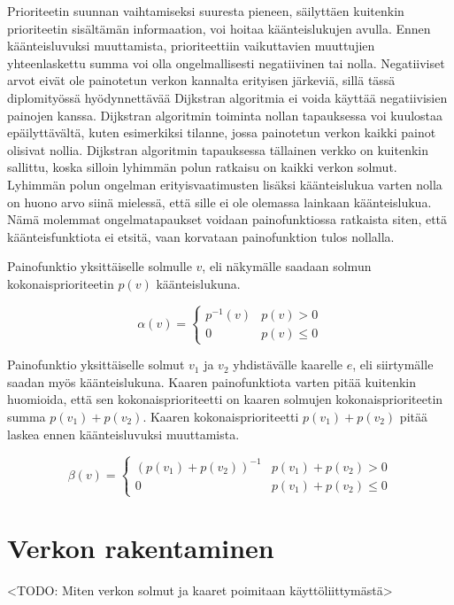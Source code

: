   Prioriteetin suunnan vaihtamiseksi suuresta pieneen, säilyttäen kuitenkin prioriteetin sisältämän informaation, voi hoitaa käänteislukujen avulla.
  Ennen käänteisluvuksi muuttamista, prioriteettiin vaikuttavien muuttujien yhteenlaskettu summa voi olla ongelmallisesti negatiivinen tai nolla.
  Negatiiviset arvot eivät ole painotetun verkon kannalta erityisen järkeviä, sillä tässä diplomityössä hyödynnettävää Dijkstran algoritmia ei voida käyttää negatiivisien painojen kanssa.
  Dijkstran algoritmin toiminta nollan tapauksessa voi kuulostaa epäilyttävältä, kuten esimerkiksi tilanne, jossa painotetun verkon kaikki painot olisivat nollia.
  Dijkstran algoritmin tapauksessa tällainen verkko on kuitenkin sallittu, koska silloin lyhimmän polun ratkaisu on kaikki verkon solmut.
  Lyhimmän polun ongelman erityisvaatimusten lisäksi käänteislukua varten nolla on huono arvo siinä mielessä, että sille ei ole olemassa lainkaan käänteislukua.
  Nämä molemmat ongelmatapaukset voidaan painofunktiossa ratkaista siten, että käänteisfunktiota ei etsitä, vaan korvataan painofunktion tulos nollalla.

  Painofunktio yksittäiselle solmulle \(v\), eli näkymälle saadaan solmun kokonaisprioriteetin \(p(v)\) käänteislukuna.

  \[\alpha(v) = \begin{cases}
    p^{-1}(v) & p(v) > 0 \\
    0 & p(v) \leq 0
  \end{cases}\]

  Painofunktio yksittäiselle solmut \(v_1\) ja \(v_2\) yhdistävälle kaarelle \(e\), eli siirtymälle saadan myös käänteislukuna.
  Kaaren painofunktiota varten pitää kuitenkin huomioida, että sen kokonaisprioriteetti on kaaren solmujen kokonaisprioriteetin summa \(p(v_1) + p(v_2)\).
  Kaaren kokonaisprioriteetti \(p(v_1) + p(v_2)\) pitää laskea ennen käänteisluvuksi muuttamista.

  \[\beta(v) = \begin{cases}
    (p(v_1) + p(v_2))^{-1} & p(v_1) + p(v_2) > 0 \\
    0 & p(v_1) + p(v_2) \leq 0
  \end{cases}\]

\section{Verkon rakentaminen} \label{ch:10_verkon_rakentaminen}

  <TODO: Miten verkon solmut ja kaaret poimitaan käyttöliittymästä>

